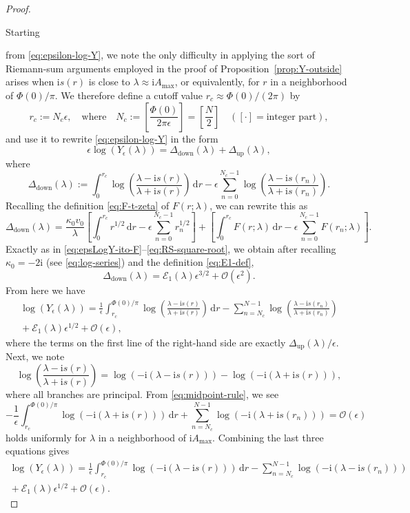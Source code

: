 \documentclass[12pt]{amsart}
\numberwithin{equation}{section}
\newcommand{\dd}{\mathrm{d}}
\newcommand{\ii}{\mathrm{i}}
\newcommand{\SP}{\lambda}
\newcommand{\phaseint}{\Phi}
\newcommand{\rr}{r}
\newcommand{\bigo}[1]{ \mathcal{O}\! \left( #1 \right) }
\def\eq{\begin{equation}}
\def\endeq{\end{equation}}
\begin{document}
\begin{proof}
\hypertarget{proof:Ytop}{Starting} from \eqref{eq:epsilon-log-Y}, we note the only difficulty in applying the sort of Riemann-sum arguments employed in the proof of Proposition~\ref{prop:Y-outside} 
arises when $\ii s(\rr)$ is close to $\SP\approx \ii A_\mathrm{max}$, or equivalently, for $\rr$ in a neighborhood of 
$\phaseint(0)/\pi$.  We therefore define a cutoff value $\rr_c\approx \phaseint(0)/(2\pi)$ by
\eq
\rr_c:=N_c\epsilon, \quad \text{where} \quad N_c:=\left[\frac{\phaseint(0)}{2\pi\epsilon}\right]=\left[\frac{N}{2}\right] \quad ([\cdot]=\text{integer part}),
\label{eq:Nc-define}
\endeq
and use it to rewrite \eqref{eq:epsilon-log-Y} in the form
\eq
\epsilon\log(Y_\epsilon(\SP)) = \Delta_{\text{down}}(\SP) + \Delta_{\text{up}}(\SP),
\endeq
where
\eq
\Delta_{\text{down}}(\SP):=\int_0^{\rr_c}\log\left(\frac{\SP-\ii s(\rr)}{\SP+\ii s(\rr)}\right)\,\dd \rr - \epsilon\sum_{n=0}^{N_c-1}\log\left(\frac{\SP-\ii s(\rr_n)}{\SP+\ii s(\rr_n)}\right).
\endeq
Recalling the definition \eqref{eq:F-t-zeta} of $F(\rr;\SP)$, 
we can rewrite this as
\eq
\Delta_{\text{down}}(\SP) = \frac{\kappa_0 v_0}{\SP}\left[\int_0^{\rr_c}\rr^{1/2}\,\dd \rr - \epsilon\sum_{n=0}^{N_c-1}\rr_n^{1/2}\right] + \left[\int_0^{\rr_c}F(\rr;\SP)\,\dd \rr - \epsilon\sum_{n=0}^{N_c-1}F(\rr_n;\SP)\right].
\endeq
Exactly as in  
\eqref{eq:epsLogY-ito-F}--\eqref{eq:RS-square-root}, we obtain after recalling $\kappa_0=-2\ii$ (see \eqref{eq:log-series}) and the definition \eqref{eq:E1-def},
 \eq
\Delta_\text{down}(\SP)=\mathcal{E}_1(\SP)\epsilon^{3/2} +\bigo{\epsilon^2}.
\endeq
From here we have 
\begin{multline}
\log(Y_\epsilon(\SP))=\frac{1}{\epsilon}\int_{\rr_c}^{\phaseint(0)/\pi}\log\left(\frac{\SP-\ii s(\rr)}{\SP+\ii s(\rr)}\right)\,\dd \rr - \sum_{n=N_c}^{N-1}\log\left(\frac{\SP-\ii s(\rr_n)}{\SP+\ii s(\rr_n)}\right)\\
{}+\mathcal{E}_1(\SP)\epsilon^{1/2}+\bigo{\epsilon},
\end{multline}
where the terms on the first line of the right-hand side are exactly $\Delta_\text{up}(\SP)/\epsilon$.
Next, we note
\eq
\log\left(\frac{\SP-\ii s(\rr)}{\SP+\ii s(\rr)}\right) = \log(-\ii(\SP-\ii s(\rr))) - \log(-\ii(\SP+\ii s(\rr))),
\endeq
where all branches are principal.  From \eqref{eq:midpoint-rule}, we 
see 
\eq
-\frac{1}{\epsilon}\int_{\rr_c}^{\phaseint(0)/\pi}\log(-\ii (\SP+\ii s(\rr)))\,\dd \rr + \sum_{n=N_c}^{N-1}\log(-\ii(\SP+\ii s(\rr_n))) = \bigo{\epsilon}
\endeq
holds uniformly for $\SP$ in a neighborhood of $\ii A_{\max}$.  Combining the last three 
equations gives
\begin{multline}
\log(Y_\epsilon(\SP))=\frac{1}{\epsilon}\int_{\rr_c}^{\phaseint(0)/\pi}\log\left(-\ii (\SP-\ii s(\rr))\right)\,\dd \rr - \sum_{n=N_c}^{N-1}\log\left(-\ii (\SP-\ii s(\rr_n))\right)\\
{}+\mathcal{E}_1(\SP)\epsilon^{1/2}+\bigo{\epsilon}.
\end{multline}


\end{proof}
\end{document}
